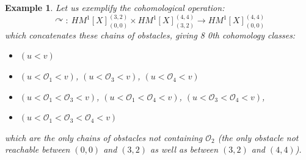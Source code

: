 \documentclass{article}
\newtheorem{example}[definition]{Example} %
\begin{document}
\begin{example}
Let us exemplify the cohomological operation:
$$\curvearrowright: \ HM^1[X]^{(3,2)}_{(0,0)}\times HM^1[X]^{(4,4)}_{(3,2)}\rightarrow HM^1[X]^{(4,4)}_{(0,0)}$$ 
\noindent which concatenates these chains of obstacles, giving 8 0th cohomology classes:
\begin{itemize}
        \item $(u < v)$
    \item $(u < \mathcal{O}_1 < v)$, $(u < \mathcal{O}_3 < v)$, $(u < \mathcal{O}_4 < v)$
    \item $(u < \mathcal{O}_1 < \mathcal{O}_3 < v)$, 
    $(u < \mathcal{O}_1 < \mathcal{O}_4 < v)$, 
    $(u < \mathcal{O}_3 < \mathcal{O}_4 < v)$, 
    \item  
    $(u < \mathcal{O}_1 < \mathcal{O}_3 < \mathcal{O}_4 < v)$
\end{itemize}
\noindent which are the only chains of obstacles not containing $\mathcal{O}_2$ (the only obstacle not reachable between $(0,0)$ and $(3,2)$ as well as between $(3,2)$ and $(4,4)$). 
\end{example}
\end{document}
